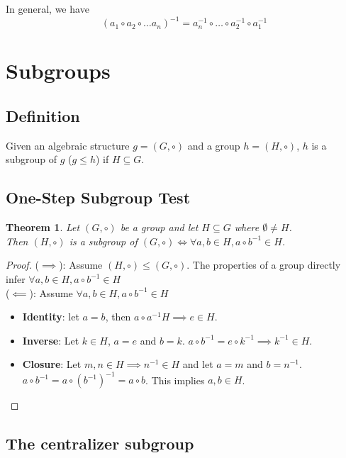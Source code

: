 \documentclass[a4paper]{article}
\begin{document}
In general, we have
\[
    (a_1 \circ a_2 \circ \dots a_n)^{-1}
    = a_n^{-1} \circ \dots \circ a_2^{-1} \circ a_1^{-1}
\]

\section{Subgroups}

\subsection{Definition}

Given an algebraic structure \(g=(G, \circ)\) and a group \(h=(H, \circ)\), \(h\)
is a subgroup of \(g\) (\(g \leq h\)) if \(H \subseteq G\).

\subsection{One-Step Subgroup Test}

\newtheorem*{theorem1}{Theorem}

\begin{theorem1}
    Let \((G, \circ)\) be a group and let \(H \subseteq G\) where \(\emptyset \neq H\).\\
    Then \((H, \circ)\) is a subgroup of \((G, \circ) \iff
    \forall a,b \in H, a \circ b^{-1} \in H\).
\end{theorem1}
\begin{proof}
    (\(\implies\)): Assume \((H, \circ) \leq (G, \circ)\).
    The properties of a group directly infer \(\forall a,b \in H, a \circ b^{-1} \in H\) \\
    (\(\impliedby\)): Assume \(\forall a,b \in H, a \circ b^{-1} \in H\)
    \begin{itemize}
        \item \textbf{Identity}: let \(a=b\), then \(a\circ a^{-1} H \implies e \in H\).
        \item \textbf{Inverse}: Let \(k\in H\), \(a=e\) and \(b=k\).
        \(a\circ b^{-1} = e \circ k^{-1} \implies k^{-1} \in H\).
        \item \textbf{Closure}: Let \(m, n \in H \implies n^{-1} \in H\) and let \(a=m\) and \(b=n^{-1}\).
        \(a\circ b^{-1} = a \circ (b^{-1})^{-1}=a\circ b\). This implies \(a, b \in H\).
    \end{itemize}
\end{proof}

\subsection{The centralizer subgroup}
\end{document}
